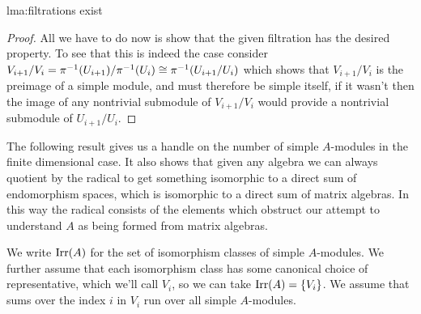 \begin{lma}{}{lma:filtrations exist}
\begin{proof}
        All we have to do now is show that the given filtration has the desired property.
        To see that this is indeed the case consider \(V_{i+1}/V_i = \pi^{-1}(U_{i+1})/\pi^{-1}(U_i) \cong \pi^{-1}(U_{i+1}/U_i)\) which shows that \(V_{i+1}/V_i\) is the preimage of a simple module, and must therefore be simple itself, if it wasn't then the image of any nontrivial submodule of \(V_{i+1}/V_i\) would provide a nontrivial submodule of \(U_{i+1}/U_i\).
    \end{proof}
\end{lma}

The following result gives us a handle on the number of simple \(A\)-modules in the finite dimensional case.
It also shows that given any algebra we can always quotient by the radical to get something isomorphic to a direct sum of endomorphism spaces, which is isomorphic to a direct sum of matrix algebras.
In this way the radical consists of the elements which obstruct our attempt to understand \(A\) as being formed from matrix algebras.

\begin{ntn}{}{}
    We write \(\operatorname{Irr}(A)\) for the set of isomorphism classes of simple \(A\)-modules.
    We further assume that each isomorphism class has some canonical choice of representative, which we'll call \(V_i\), so we can take \(\operatorname{Irr}(A) = \{V_i\}\).
    We assume that sums over the index \(i\) in \(V_i\) run over all simple \(A\)-modules.
\end{ntn}


